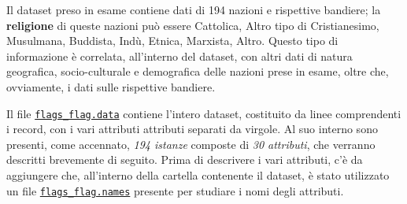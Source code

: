 \documentclass[a4paper,11pt,twoside,notitlepage,final]{scrartcl}
\begin{document}
Il dataset preso in esame contiene dati di 194 nazioni e rispettive bandiere;
la \textbf{religione} di queste nazioni può essere Cattolica, Altro tipo di Cristianesimo, Musulmana, Buddista, Indù, Etnica, Marxista, Altro.
Questo tipo di informazione è correlata, all'interno del dataset, con altri dati di natura geografica, socio-culturale e demografica delle nazioni prese in esame, oltre che, ovviamente, i dati sulle rispettive bandiere.

Il file \href{http://archive.ics.uci.edu/ml/machine-learning-databases/flags/flag.data}{\texttt{flags\_flag.data}}
contiene l'intero dataset, costituito da linee comprendenti i record, con i vari attributi attributi separati da virgole.
Al suo interno sono presenti, come accennato, \emph{194 istanze} composte di \emph{30 attributi}, che verranno descritti brevemente di seguito.
Prima di descrivere i vari attributi, c'è da aggiungere che, all'interno della cartella contenente il dataset, è stato utilizzato un file
\href{http://archive.ics.uci.edu/ml/machine-learning-databases/flags/flag.names}{\texttt{flags\_flag.names}} presente per studiare i nomi degli attributi.
\end{document}
